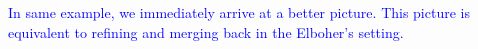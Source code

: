 \documentclass[sigplan,screen,natbib=false]{acmart}
\newcommand{\dmcmt}[1]{\textcolor{blue}{#1}}
\begin{document}
\dmcmt{
    In same example, we immediately arrive at a better picture. 
    This picture is equivalent to refining and merging back in the Elboher's
    setting.
} 


%
%
%
%
%
%
%
%
%
\end{document}
